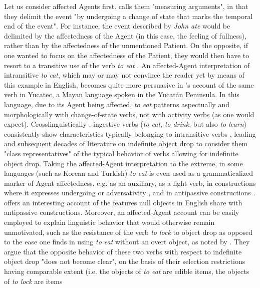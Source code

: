 Let us consider affected Agents first. \textcite[158]{tenny1994aspectual} calls them "measuring arguments", in that they delimit the event "by undergoing a change of state that marks the temporal end of the event". For instance, the event described by \textit{John ate} would be delimited by the affectedness of the Agent (in this case, the feeling of fullness), rather than by the affectedness of the unmentioned Patient. On the opposite, if one wanted to focus on the affectedness of the Patient, they would then have to resort to a transitive use of the verb \textit{to eat} \parencite[80]{Naess2007}. An affected-Agent interpretation of intransitive \textit{to eat}, which may or may not convince the reader yet by means of this example in English, becomes quite more persuasive in \textcite[61-63]{Naess2007}'s account of the same verb in Yucatec, a Mayan language spoken in the Yucatán Peninsula. In this language, due to its Agent being affected, \textit{to eat} patterns aspectually and morphologically with change-of-state verbs, not with activity verbs (as one would expect). Crosslinguistically \parencite[126]{Naess2007}, ingestive verbs (\textit{to eat}, \textit{to drink}, but also \textit{to learn}) consistently show characteristics typically belonging to intransitive verbs \parencite{Amberber2009}, leading \textcite{marantz1981nature} and subsequent decades of literature on indefinite object drop to consider them "class representatives" of the typical behavior of verbs allowing for indefinite object drop. Taking the affected-Agent interpretation to the extreme, in some languages (such as Korean and Turkish) \textit{to eat} is even used as a grammaticalized marker of Agent affectedness, e.g. as an auxiliary, as a light verb, in constructions where it expresses undergoing or adversativity \parencite[75]{Naess2007}, and in antipassive constructions \parencite[414]{Naess2011}.  \textcite{Nicolas2019} offers an interesting account of the features null objects in English share with antipassive constructions. Moreover, an affected-Agent account can be easily employed to explain linguistic behavior that would otherwise remain unmotivated, such as the resistance of the verb \textit{to lock} to object drop as opposed to the ease one finds in using \textit{to eat} without an overt object, as noted by \textcite[30]{PethoKardos2006}. They argue that the opposite behavior of these two verbs with respect to indefinite object drop "does not become clear", on the basis of their selection restrictions having comparable extent (i.e. the objects of \textit{to eat} are edible items, the objects of \textit{to lock} are items 